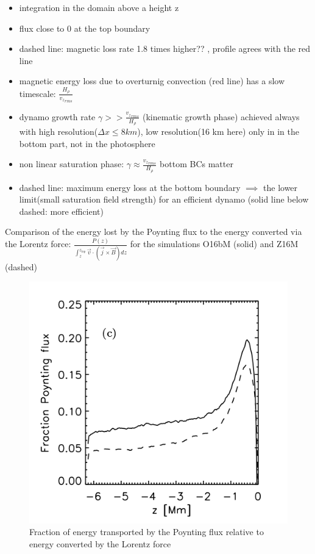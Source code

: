 \documentclass{beamer}
\begin{document}
\begin{frame}

\begin{itemize}
\item integration in the domain above a height z
\item flux close to 0 at the top boundary
\item dashed line: magnetic loss  rate 1.8 times higher?? , profile  agrees with the red line
\item magnetic energy loss due to overturnig convection (red line) has a slow timescale: $\frac{H_{\rho}}{{v_z}_{rms}}$
\item dynamo growth rate $\gamma >> \frac{{v_z}_{rms}}{H_{\rho}}$ (kinematic growth phase) achieved always with high resolution($\Delta x \le 8km$), low resolution(16 km here) only in in the bottom part,
not in the photosphere
\item non linear saturation phase:  $\gamma \approx \frac{{v_z}_{rms}}{H_{\rho}}$ bottom BCs matter
\item dashed line: maximum energy loss at the bottom boundary $\implies$ the lower limit(small saturation field strength)  for an efficient dynamo (solid line below dashed: more efficient) 
\end{itemize}

\end{frame}

\begin{frame}{Comparison of the energy lost by the Poynting flux to the
energy converted via the Lorentz force:  $\frac{P(z)}{\int_z^{z_{top}}{ \vec{v} \cdot \left( \vec{j} \times \vec{B} \right)dz }}$ for the simulations O16bM (solid) and Z16M (dashed)}

\begin{figure}[H]
 \centering
 \includegraphics[scale=0.3]{poynting3.png}
	\caption{Fraction of energy transported by the Poynting flux relative to energy converted by the Lorentz
force}
\end{figure}

\end{frame}
\end{document}
